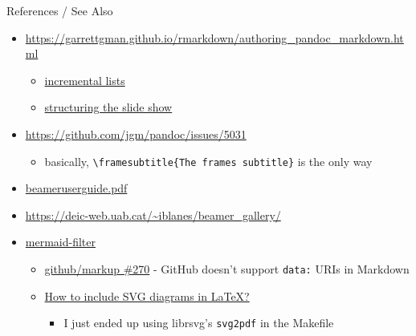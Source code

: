 \documentclass[
  ignorenonframetext,
  aspectratio=169,
]{beamer}
\providecommand{\tightlist}{%
  \setlength{\itemsep}{0pt}\setlength{\parskip}{0pt}}
\begin{document}
\begin{frame}[fragile]{References / See Also}
\begin{itemize}
\tightlist
\item
  \url{https://garrettgman.github.io/rmarkdown/authoring_pandoc_markdown.html}

  \begin{itemize}
  \tightlist
  \item
    \href{https://garrettgman.github.io/rmarkdown/authoring_pandoc_markdown.html\#incremental_lists}{incremental
    lists}
  \item
    \href{https://garrettgman.github.io/rmarkdown/authoring_pandoc_markdown.html\#structuring_the_slide_show}{structuring
    the slide show}
  \end{itemize}
\item
  \url{https://github.com/jgm/pandoc/issues/5031}

  \begin{itemize}
  \tightlist
  \item
    basically,
    \texttt{\textbackslash{}framesubtitle\{The\ frame\textquotesingle{}s\ subtitle\}}
    is the only way
  \end{itemize}
\item
  \href{http://ctan.math.utah.edu/ctan/tex-archive/macros/latex/contrib/beamer/doc/beameruserguide.pdf}{beameruserguide.pdf}
\item
  \url{https://deic-web.uab.cat/~iblanes/beamer_gallery/}
\item
  \href{https://github.com/raghur/mermaid-filter}{mermaid-filter}

  \begin{itemize}
  \tightlist
  \item
    \href{https://github.com/github/markup/issues/270}{github/markup
    \#270} - GitHub doesn't support \texttt{data:} URIs in Markdown
  \item
    \href{https://tex.stackexchange.com/a/2107}{How to include SVG
    diagrams in LaTeX?}

    \begin{itemize}
    \tightlist
    \item
      I just ended up using librsvg's \texttt{svg2pdf} in the Makefile
    \end{itemize}
  \end{itemize}
\end{itemize}
\end{frame}
\end{document}
